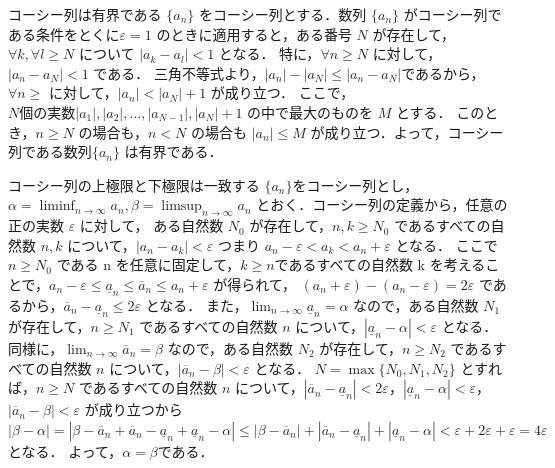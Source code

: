 \documentclass[a4paper]{ltjsarticle}
\begin{document}
  \begin{lemma}{コーシー列は有界である}{}
   $\{a_n\}$ をコーシー列とする．数列 $\{a_n\}$ がコーシー列である条件をとくに$\varepsilon = 1$ のときに適用すると，ある番号 $N$ が存在して，$\forall k, \forall l \geq N$ について $|a_k - a_l| < 1$ となる．
   特に，$\forall n \geq N$ に対して，$|a_n - a_N| < 1$ である．
   三角不等式より，$|a_n| - |a_N| \leq |a_n - a_N|$であるから，$\forall n \geq$ に対して，$|a_n| < |a_N| + 1$ が成り立つ．
   ここで，$N 個の実数 |a_1|, |a_2|, \ldots, |a_{N-1}|, |a_N| + 1$ の中で最大のものを $M$ とする．
   このとき，$n \geq N$ の場合も，$n < N$ の場合も $|a_n| \leq M$ が成り立つ．よって，コーシー列である数列$\{a_n\}$ は有界である．
  \end{lemma}

  \begin{lemma}{コーシー列の上極限と下極限は一致する}{}
   $\{a_n\}$をコーシー列とし，$\alpha = \displaystyle \liminf_{n \to \infty} a_n, \beta = \limsup_{n \to \infty} a_n$ とおく．コーシー列の定義から，任意の正の実数 $\varepsilon$ に対して，
   ある自然数 $N_0$ が存在して，$n, k \geq N_0$ であるすべての自然数 $n, k$ について，$|a_n - a_k| < \varepsilon$ つまり $a_n - \varepsilon < a_k < a_n+ \varepsilon$ となる．
   ここで $n \geq N_0$ である n を任意に固定して，$k \geq n $であるすべての自然数 k を考えることで，$a_n - \varepsilon \leq \underline{a}_n \leq \overline{a}_n \leq a_n + \varepsilon$ が得られて，
   $(a_n + \varepsilon) - (a_n - \varepsilon ) = 2\varepsilon$ であるから，$\overline{a}_n - \underline{a}_n \leq 2\varepsilon$
   となる．
   また，$\displaystyle \lim_{n \to \infty} \underline{a}_n = \alpha$ なので，ある自然数 $N_1$ が存在して，$n \geq N_1$ であるすべての自然数 $n$ について，$|\underline{a}_n - \alpha| < \varepsilon$ となる．
   同様に，$\displaystyle \lim_{n \to \infty} \overline{a}_n = \beta$ なので，ある自然数 $N_2$ が存在して，$n \geq N_2$ であるすべての自然数 $n$ について，$|\overline{a}_n - \beta| < \varepsilon$ となる．
   $N = \max\{N_0, N_1, N_2\}$ とすれば，$n \geq N$ であるすべての自然数 $n$ について，$|\overline{a}_n - \underline{a}_n| < 2\varepsilon$，$|\underline{a}_n - \alpha| < \varepsilon$，$|\overline{a}_n - \beta| < \varepsilon$ が成り立つから
   $|\beta - \alpha| = |\beta - \overline{a}_n + \overline{a}_n - \underline{a}_n + \underline{a}_n - \alpha| \leq |\beta - \overline{a}_n |+ |\overline{a}_n - \underline{a}_n| + | \underline{a}_n - \alpha| < \varepsilon + 2\varepsilon + \varepsilon = 4\varepsilon$ となる． 
   よって，$\alpha = \beta $である．
  \end{lemma}
\end{document}
